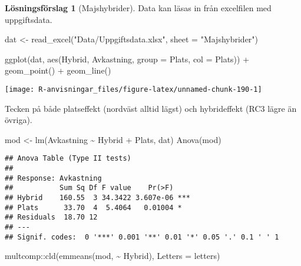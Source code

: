 \documentclass[
]{book}
\newenvironment{Shaded}{\begin{snugshade}}{\end{snugshade}}
\newcommand{\AttributeTok}[1]{\textcolor[rgb]{0.77,0.63,0.00}{#1}}
\newcommand{\FunctionTok}[1]{\textcolor[rgb]{0.00,0.00,0.00}{#1}}
\newcommand{\NormalTok}[1]{#1}
\newcommand{\OtherTok}[1]{\textcolor[rgb]{0.56,0.35,0.01}{#1}}
\newcommand{\SpecialCharTok}[1]{\textcolor[rgb]{0.00,0.00,0.00}{#1}}
\newcommand{\StringTok}[1]{\textcolor[rgb]{0.31,0.60,0.02}{#1}}
\theoremstyle{definition}
\theoremstyle{definition}
\theoremstyle{definition}
\theoremstyle{definition}
\newtheorem{hypothesis}{Lösningsförslag}[chapter]
\theoremstyle{remark}
\begin{document}
\begin{hypothesis}[Majshybrider]
Data kan läsas in från excelfilen med uppgiftsdata.

\begin{Shaded}
\begin{Highlighting}[]
\NormalTok{dat }\OtherTok{\textless{}{-}} \FunctionTok{read\_excel}\NormalTok{(}\StringTok{"Data/Uppgiftsdata.xlsx"}\NormalTok{, }\AttributeTok{sheet =} \StringTok{"Majshybrider"}\NormalTok{)}

\FunctionTok{ggplot}\NormalTok{(dat, }\FunctionTok{aes}\NormalTok{(Hybrid, Avkastning, }\AttributeTok{group =}\NormalTok{ Plats, }\AttributeTok{col =}\NormalTok{ Plats)) }\SpecialCharTok{+}
  \FunctionTok{geom\_point}\NormalTok{() }\SpecialCharTok{+}
  \FunctionTok{geom\_line}\NormalTok{()}
\end{Highlighting}
\end{Shaded}

\begin{center}\texttt{[image: R-anvisningar\_files/figure-latex/unnamed-chunk-190-1]} \end{center}

Tecken på både platseffekt (nordväst alltid lägst) och hybrideffekt (RC3 lägre än övriga).

\begin{Shaded}
\begin{Highlighting}[]
\NormalTok{mod }\OtherTok{\textless{}{-}} \FunctionTok{lm}\NormalTok{(Avkastning }\SpecialCharTok{\textasciitilde{}}\NormalTok{ Hybrid }\SpecialCharTok{+}\NormalTok{ Plats, dat)}
\FunctionTok{Anova}\NormalTok{(mod)}
\end{Highlighting}
\end{Shaded}

\begin{verbatim}
## Anova Table (Type II tests)
## 
## Response: Avkastning
##           Sum Sq Df F value    Pr(>F)    
## Hybrid    160.55  3 34.3422 3.607e-06 ***
## Plats      33.70  4  5.4064   0.01004 *  
## Residuals  18.70 12                      
## ---
## Signif. codes:  0 '***' 0.001 '**' 0.01 '*' 0.05 '.' 0.1 ' ' 1
\end{verbatim}

\begin{Shaded}
\begin{Highlighting}[]
\NormalTok{multcomp}\SpecialCharTok{::}\FunctionTok{cld}\NormalTok{(}\FunctionTok{emmeans}\NormalTok{(mod, }\SpecialCharTok{\textasciitilde{}}\NormalTok{ Hybrid), }\AttributeTok{Letters =}\NormalTok{ letters)}
\end{Highlighting}
\end{Shaded}


\end{hypothesis}
\end{document}
